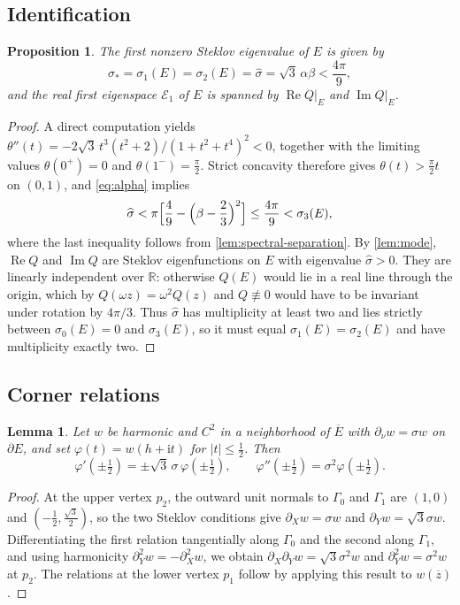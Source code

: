 \documentclass[11pt,reqno]{amsart}
\numberwithin{equation}{section}
\newtheorem{proposition}[proposition]{Proposition}
\newtheorem{lemma}[lemma]{Lemma}
\theoremstyle{remark}
\newcommand{\R}{\mathbb R}
\newcommand{\ii}{\mathrm i}
\newcommand{\om}{\omega}
\DeclareMathOperator{\Rea}{Re}
\DeclareMathOperator{\Ima}{Im}
\begin{document}
\subsection{Identification}
\begin{proposition}\label{prop:identification}
The first nonzero Steklov eigenvalue of $E$ is given by
\[
 \sigma_*=\sigma_1(E)=\sigma_2(E)=\widehat\sigma=\sqrt3\,\alpha\beta<\frac{4\pi}{9},
\]
and the real first eigenspace $\mathcal E_1$ of $E$ is spanned by
$\Rea Q|_E$ and $\Ima Q|_E$.
\end{proposition}
\begin{proof}
A direct computation yields
$\theta''(t)=-2\sqrt3\,t^3(t^2+2)/(1+t^2+t^4)^2<0$, together with the limiting
values $\theta(0^+)=0$ and $\theta(1^-)=\frac\pi2$. Strict concavity therefore
gives $\theta(t)>\frac\pi2t$ on $(0,1)$, and \eqref{eq:alpha} implies
\[\widehat\sigma<\pi\Bigl[\frac49-\Bigl(\beta-\frac23\Bigr)^2\Bigr] \le\frac{4\pi}9<\sigma_3(E),\]
where the last inequality follows from \cref{lem:spectral-separation}. By
\cref{lem:mode}, $\Rea Q$ and $\Ima Q$ are Steklov eigenfunctions on $E$ with
eigenvalue $\widehat\sigma>0$. They are linearly independent over $\R$: otherwise
$Q(E)$ would lie in a real line through the origin, which by $Q(\om z)=\om^2Q(z)$
and $Q\not\equiv0$ would have to be invariant under rotation by $4\pi/3$. Thus
$\widehat\sigma$ has multiplicity at least two and lies strictly between
$\sigma_0(E)=0$ and $\sigma_3(E)$, so it must equal $\sigma_1(E)=\sigma_2(E)$
and have multiplicity exactly two.
\end{proof}

\subsection{Corner relations}
\begin{lemma}\label{lem:corner}
Let $w$ be harmonic and $C^2$ in a neighborhood of $\overline E$ with
$\partial_\nu w=\sigma w$ on $\partial E$, and set
$\varphi(t)=w(h+\ii t)$ for $|t|\le\frac12$. Then
\begin{equation}\label{eq:corner}
 \varphi'(\pm\tfrac12)=\pm\sqrt3\,\sigma\,\varphi(\pm\tfrac12),\qquad
 \varphi''(\pm\tfrac12)=\sigma^2\varphi(\pm\tfrac12).
\end{equation}
\end{lemma}
\begin{proof}
At the upper vertex $p_2$, the outward unit normals to $\Gamma_0$ and $\Gamma_1$
are $(1,0)$ and $(-\frac12,\frac{\sqrt3}2)$, so the two Steklov conditions give
$\partial_Xw=\sigma w$ and $\partial_Yw=\sqrt3\sigma w$. Differentiating the first
relation tangentially along $\Gamma_0$ and the second along $\Gamma_1$, and using
harmonicity $\partial_Y^2w=-\partial_X^2w$, we obtain
$\partial_X\partial_Yw=\sqrt3\sigma^2w$ and $\partial_Y^2w=\sigma^2w$ at $p_2$.
The relations at the lower vertex $p_1$ follow by applying this result to
$w(\overline z)$.
\end{proof}
\end{document}
